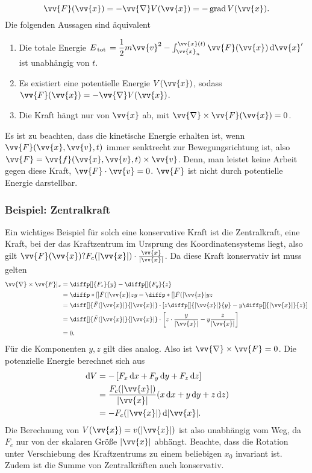 \documentclass[a4paper,12pt]{article}
\newcommand{\td}{\,\text{d}}
\numberwithin{equation}{section}
\begin{document}
\[ 
        \vv{F}(\vv{x})=-\vv{\nabla }V(\vv{x})=-\,\text{grad}\,V(\vv{x})
.\] 
Die folgenden Aussagen sind äquivalent
\begin{enumerate}[label=\arabic*.]
        \item Die totale Energie $E_{\,\text{tot}\,}=\dfrac{1}{2}m\vv{v}^2-\int_{\vv{x}_n}^{\vv{x}(t)}\vv{F}(\vv{x})\td \vv{x}'$ ist unabhängig von $t$.
        \item Es existiert eine potentielle Energie $V(\vv{x})$, sodass $\vv{F}(\vv{x})=-\vv{\nabla }V(\vv{x})$.
        \item Die Kraft hängt nur von $\vv{x}$ ab, mit $\vv{\nabla }\times \vv{F}(\vv{x})=0$.
\end{enumerate}
Es ist zu beachten, dass die kinetische Energie erhalten ist, wenn $\vv{F}(\vv{x},\vv{v},t)$ immer senktrecht zur Bewegungsrichtung ist, also $\vv{F}=\vv{f}(\vv{x},\vv{v},t)\times \vv{v}$. Denn, man leistet keine Arbeit gegen diese Kraft, $\vv{F}\cdot \vv{v}=0$. $\vv{F}$ ist nicht durch potentielle Energie darstellbar. 

\subsubsection{Beispiel: Zentralkraft}
Ein wichtiges Beispiel für solch eine konservative Kraft ist die Zentralkraft, eine Kraft, bei der das Kraftzentrum im Ursprung des Koordinatensystems liegt, also gilt $\vv{F}(\vv{x})?F_c(|\vv{x}|)\cdot \tfrac{\vv{x}}{|\vv{x}|}$. Da diese Kraft konservativ ist muss gelten
\begin{align*}
        \vv{\nabla }\times \vv{F}|_x&=\diffp[]{F_z}{y}-\diffp[]{F_y}{z}\\
                                    &=\diffp*[]{\tilde F(|\vv{x}|z}{y}-\diffp*[]{\tilde F(|\vv{x}|y}{z}\\
                                    &=\diff[]{\tilde F(|\vv{x}|}{|\vv{x}|}\cdot \left[z\diffp[]{|\vv{x}|}{y}-y\diffp[]{|\vv{x}|}{z}\right]\\
                                    &=\diff[]{\tilde F(|\vv{x}|}{|\vv{x}|}\cdot \left[z\cdot \dfrac{y}{|\vv{x}|}-y\dfrac{z}{|\vv{x}|}\right]\\
                                    &=0
.\end{align*}
Für die Komponenten $y,z$ gilt dies analog. Also ist $\vv{\nabla }\times \vv{F}=0$. Die potenzielle Energie berechnet sich aus
\begin{align*}
        \td V&=-\left[F_x\td x+F_y\td y+F_z\td z\right]\\
             &=\dfrac{F_c(|\vv{x}|)}{|\vv{x}|}(x\td x+y\td y+z\td z)\\
             &=-F_c(|\vv{x}|)\td |\vv{x}|
.\end{align*}
Die Berechnung von $V(\vv{x})=v(|\vv{x}|)$ ist also unabhängig vom Weg, da $F_c$ nur von der skalaren Größe $|\vv{x}|$ abhängt. Beachte, dass die Rotation unter Verschiebung des Kraftzentrums zu einem beliebigen $x_0$ invariant ist. Zudem ist die Summe von Zentralkräften auch konservativ.
\end{document}
